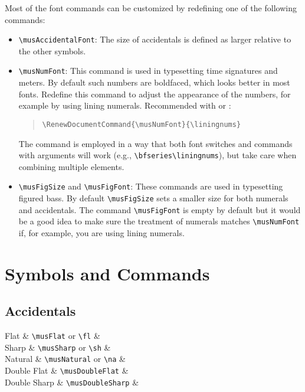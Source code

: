 \documentclass{article}
\begin{document}
Most of the font commands can be customized by redefining one of the following
commands:
\begin{itemize}
    \item \verb|\musAccidentalFont|: The size of accidentals is defined as
        larger relative to the other symbols.

    \item \verb|\musNumFont|: This command is used in typesetting time
        signatures and meters. By default such numbers are boldfaced, which
        looks better in most fonts. Redefine this command to adjust the
        appearance of the numbers, for example by using lining numerals.
        Recommended with  or :
        \begin{quote}
            \verb|\RenewDocumentCommand{\musNumFont}{\liningnums}|
        \end{quote}
        The command is employed in a way that both font switches and commands
        with arguments will work (e.g., \verb|\bfseries\liningnums|), but take
        care when combining multiple elements.

    \item \verb|\musFigSize| and \verb|\musFigFont|: These commands are used
        in typesetting figured bass. By default \verb|\musFigSize| sets a
        smaller size for both numerals and accidentals. The command
        \verb|\musFigFont| is empty by default but it would be a good idea to
        make sure the treatment of numerals matches \verb|\musNumFont| if, for
        example, you are using lining numerals.
\end{itemize}


\section{Symbols and Commands}

\subsection{Accidentals}

\begin{codetable}
    Flat & \verb|\musFlat| or \verb|\fl| & \musFlat\\
    Sharp & \verb|\musSharp| or \verb|\sh| & \musSharp\\
    Natural & \verb|\musNatural| or \verb|\na| & \musNatural\\
    Double Flat & \verb|\musDoubleFlat| & \musDoubleFlat\\
    Double Sharp & \verb|\musDoubleSharp| & \musDoubleSharp\\
\end{codetable}
\end{document}
